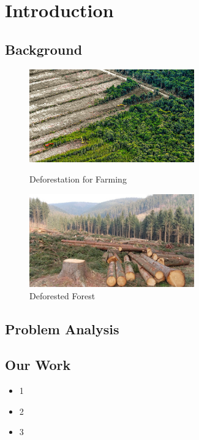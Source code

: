\documentclass{HZNUMCM}
\begin{document}
\showSummarySheet
\showContents

  \section{Introduction}
    \subsection{Background}
      \begin{figure}[ht]
      \centering
        \begin{minipage}[b]{0.45\linewidth}
            \centering
            \includegraphics[height=4cm, keepaspectratio]{images/deforestation1.jpg} %
            \caption{Deforestation for Farming}
            \label{fig:deforestation1}
        \end{minipage}
      \hspace{0.05\linewidth}
        \begin{minipage}[b]{0.45\linewidth}
            \centering
            \includegraphics[height=4cm, keepaspectratio]{images/deforestation2.jpg} %
            \caption{Deforested Forest}
            \label{fig:deforestation2}
        \end{minipage}
      \end{figure}
    \subsection{Problem Analysis}
    \subsection{Our Work}
    \begin{itemize}
      \item 1
      \item 2
      \item 3
    \end{itemize}
\end{document}
